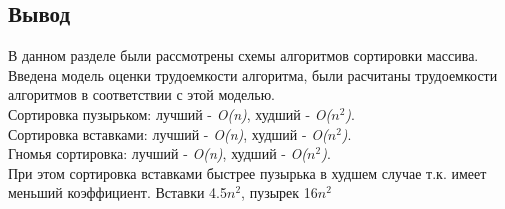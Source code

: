 \documentclass[a4paper, 12pt]{article}
\begin{document}
\begin{flushleft}
	\subsection{Вывод}
	\hspace*{5mm} В данном разделе были рассмотрены схемы алгоритмов сортировки массива. Введена модель оценки трудоемкости алгоритма, были расчитаны трудоемкости алгоритмов в соответствии с этой моделью. \newline
	\\ Сортировка пузырьком: лучший - {\it O(n)}, худший - {\it O($n^2$)}.
	\\ Сортировка вставками: лучший - {\it O(n)}, худший - {\it O($n^2$)}.
	\\ Гномья сортировка: лучший - {\it O(n)}, худший - {\it O($n^2$)}. \newline
	\\ \hspace*{5mm} При этом сортировка вставками быстрее пузырька в худшем случае т.к. имеет меньший коэффициент. Вставки 4.5$n^2$, пузырек 16$n^2$	
\end{flushleft}

\newpage
\end{document}

